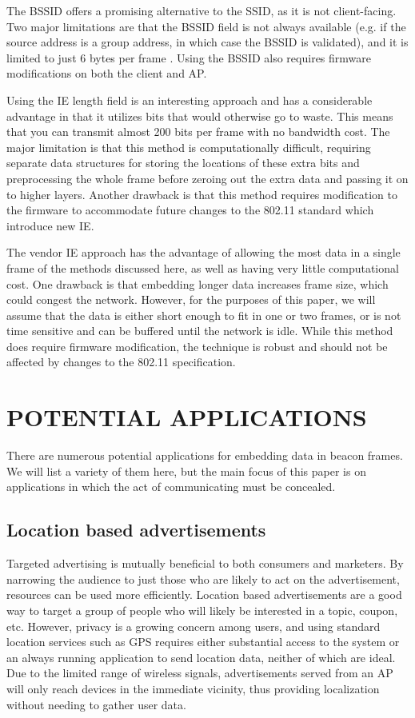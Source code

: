 \documentclass[letterpaper, 10 pt, conference]{ieeeconf}  %
\begin{document}
The BSSID offers a promising alternative to the SSID, as it is not client-facing.  Two major limitations are that the BSSID field is not always available (e.g. if the source address is a group address, in which case the BSSID is validated), and it is limited to just 6 bytes per frame \cite{c2}.  Using the BSSID also requires firmware modifications on both the client and AP.

Using the IE length field is an interesting approach and has a considerable advantage in that it utilizes bits that would otherwise go to waste. This means that you can transmit almost 200 bits per frame with no bandwidth cost.  The major limitation is that this method is computationally difficult, requiring separate data structures for storing the locations of these extra bits and preprocessing the whole frame before zeroing out the extra data and passing it on to higher layers. Another drawback is that this method requires modification to the firmware to accommodate future changes to the 802.11 standard which introduce new IE.

The vendor IE approach has the advantage of allowing the most data in a single frame of the methods discussed here, as well as having very little computational cost.  One drawback is that embedding longer data increases frame size, which could congest the network.  However, for the purposes of this paper, we will assume that the data is either short enough to fit in one or two frames, or is not time sensitive and can be buffered until the network is idle. While this method does require firmware modification, the technique is robust and should not be affected by changes to the 802.11 specification.


\section{POTENTIAL APPLICATIONS}

There are numerous potential applications for embedding data in beacon frames.  We will list a variety of them here, but the main focus of this paper is on applications in which the act of communicating must be concealed.

\subsection{Location based advertisements}

Targeted advertising is mutually beneficial to both consumers and marketers.  By narrowing the audience to just those who are likely to act on the advertisement, resources can be used more efficiently.  Location based advertisements are a good way to target a group of people who will likely be interested in a topic, coupon, etc.  However, privacy is a growing concern among users, and using standard location services such as GPS requires either substantial access to the system or an always running application to send location data, neither of which are ideal. Due to the limited range of wireless signals, advertisements served from an AP will only reach devices in the immediate vicinity, thus providing localization without needing to gather user data.
\end{document}
